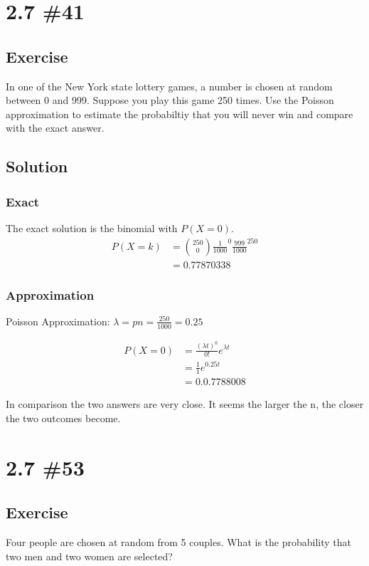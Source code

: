 \documentclass[12pt]{article}
\begin{document}
\section{2.7 \#41} 
\subsection{Exercise}
In one of the New York state lottery games, a number is chosen at random between 0 and 999. Suppose you play this
game 250 times. Use the Poisson approximation to estimate the probabiltiy that you will never win and
compare with the exact answer.

\subsection{Solution}
\subsubsection{Exact}\label{ssub:approximation}
The exact solution is the binomial with $P(X=0)$.
\begin{align*}
  P(X=k)&=\binom{250}{0}\frac{1}{1000}^0\frac{999}{1000}^{250}\\
        &=0.77870338
\end{align*}



\subsubsection{Approximation}\label{ssub:approximation}
Poisson Approximation:
$\lambda = pn=\frac{250}{1000}=0.25$

\begin{align*}
  P(X=0)&=\frac{(\lambda t)^0}{0!}e^{\lambda t}\\
         &=\frac{1}{1}e^{0.25 t}\\
        &=0.0.7788008
\end{align*}

In comparison the two answers are very close. It seems the larger the n, the closer the two outcomes become.


\section{2.7 \#53} 
\subsection{Exercise}
Four people are chosen at random from 5 couples. What is the probability that two men and two women are selected?
\end{document}
